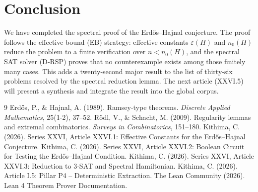 \documentclass[11pt,a4paper]{article}
\begin{document}
\section{Conclusion}
We have completed the spectral proof of the Erdős–Hajnal conjecture. The proof follows the effective bound (EB) strategy: effective constants $\varepsilon(H)$ and $n_0(H)$ reduce the problem to a finite verification over $n < n_0(H)$, and the spectral SAT solver (D‑RSP) proves that no counterexample exists among those finitely many cases. This adds a twenty‑second major result to the list of thirty‑six problems resolved by the spectral reduction lemma. The next article (XXVI.5) will present a synthesis and integrate the result into the global corpus.


\begin{thebibliography}{9}
  Erdős, P., \& Hajnal, A. (1989). Ramsey-type theorems. \emph{Discrete Applied Mathematics}, 25(1-2), 37–52.
  Rödl, V., \& Schacht, M. (2009). Regularity lemmas and extremal combinatorics. \emph{Surveys in Combinatorics}, 151–180.
  Kithima, C. (2026). Series XXVI, Article XXVI.1: Effective Constants for the Erdős–Hajnal Conjecture.
  Kithima, C. (2026). Series XXVI, Article XXVI.2: Boolean Circuit for Testing the Erdős–Hajnal Condition.
  Kithima, C. (2026). Series XXVI, Article XXVI.3: Reduction to 3‑SAT and Spectral Hamiltonian.
  Kithima, C. (2026). Article I.5: Pillar P4 – Deterministic Extraction.
  The Lean Community (2026). Lean 4 Theorem Prover Documentation.
\end{thebibliography}
\end{document}
